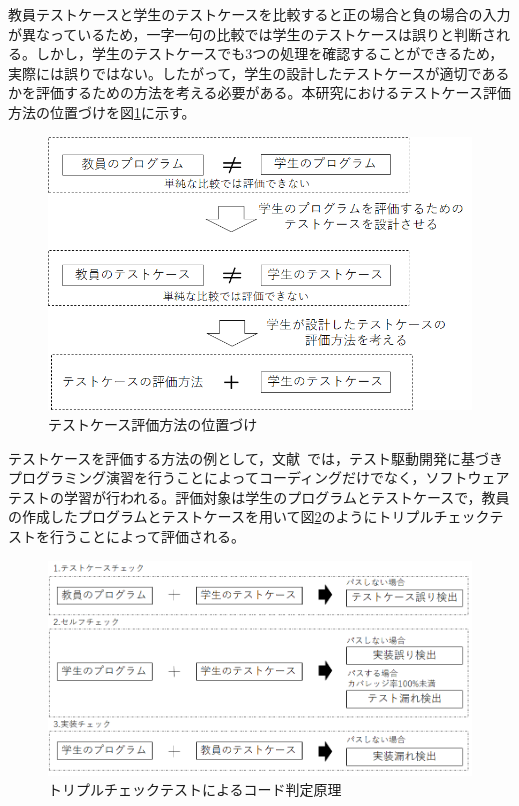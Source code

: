 \documentclass{tpu-sotu}
\begin{document}
教員テストケースと学生のテストケースを比較すると正の場合と負の場合の入力が異なっているため，一字一句の比較では学生のテストケースは誤りと判断される。しかし，学生のテストケースでも3つの処理を確認することができるため，実際には誤りではない。したがって，学生の設計したテストケースが適切であるかを評価するための方法を考える必要がある。本研究におけるテストケース評価方法の位置づけを図\ref{a1}に示す。
\begin{figure}[h]
  \centering
  \includegraphics[width=130mm]{テストケース評価方法の位置づけ.png}
  \caption{テストケース評価方法の位置づけ}
  \label{a1}
\end{figure}
\newpage
テストケースを評価する方法の例として，文献~\cite{a0}では，テスト駆動開発に基づきプログラミング演習を行うことによってコーディングだけでなく，ソフトウェアテストの学習が行われる。評価対象は学生のプログラムとテストケースで，教員の作成したプログラムとテストケースを用いて図\ref{a2}のようにトリプルチェックテストを行うことによって評価される。
\newpage
\begin{figure}[h]
  \centering
  \includegraphics[width=130mm]{トリプルチェック.png}
  \caption{トリプルチェックテストによるコード判定原理}
  \label{a2}
\end{figure}
\end{document}
